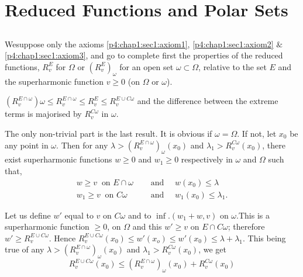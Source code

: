 \chapter{Reduced Functions and Polar Sets}\label{p4:chap7}

\setcounter{section}{30}
\section{}\label{p4:chap7:sec31}%

We\pageoriginale suppose only the
axioms \ref{p4:chap1:sec1:axiom1}, \ref{p4:chap1:sec1:axiom2}
$\&$ \ref{p4:chap1:sec1:axiom3}, and go to complete first the 
properties of the reduced functions, $R^E_v$ for $\Omega$ or
$(R^E_v)_\omega$ for an open set $\omega \subset \Omega$, relative to
the set $E$ and the superharmonic function $v \geq 0$ (on $\Omega$ or
$\omega$). 

\setcounter{Lemma}{0}
\begin{Lemma}\label{p4:chap7:sec31:lem1}%
  $(R^{E \cap \omega}_v)\omega \leq R^{E \cap \omega}_v \leq R_v^{E}\leq R^{E \cup
    C \omega}_v$ and the difference between the extreme terms is
  majorised by $R^{C \omega}_v$ in $\omega$. 
\end{Lemma}

The only non-trivial part is the last result. It is obvious if $\omega
= \Omega$. If not, let $x_0$ be any point in $\omega$. Then for any
$\lambda > (R^{E \cap \omega}_v)_\omega (x_0)$ and $\lambda_1 > R^{C
  \omega}_v (x_0)$, there exist superharmonic functions $w \geq 0$ and
$w_1 \geq 0$ respectively in $\omega$ and $\Omega$ such that, 
\begin{align*}
  w \geq v ~ \text{ on } E \cap \omega & \quad \text{ and } \quad
  w(x_0) \leq \lambda \\ 
  w_1 \geq v ~ \text{ on } C \omega & \quad \text{ and } \quad
  w_1(x_0) \leq \lambda _1.  
\end{align*}

Let us define $w'$ equal to $v$ on $C \omega$ and to $\inf.(w_1 +w,v)$
on $\omega$.This is a superharmonic function $\geq 0$, on $\Omega$ and
this $w' \geq v$ on $E \cap C \omega$; therefore $w' \geq R^{E \cup C
  \omega}_v$. Hence $R^{E \cup C \omega}_v(x_0) \leq w' (x_o) \leq w'
(x_0) \leq \lambda + \lambda_1$. This being true of any $\lambda > (R_v 
^{E \cap \omega})_\omega (x_0)$ and $\lambda_1 > R^{C \omega}_v(x_0)$,
we get 
$$
R^{E \cup C \omega}_v (x_0) \leq (R^{E \cap \omega}_v)_\omega (x_0) +
R^{C \omega}_v (x_0) 
$$

